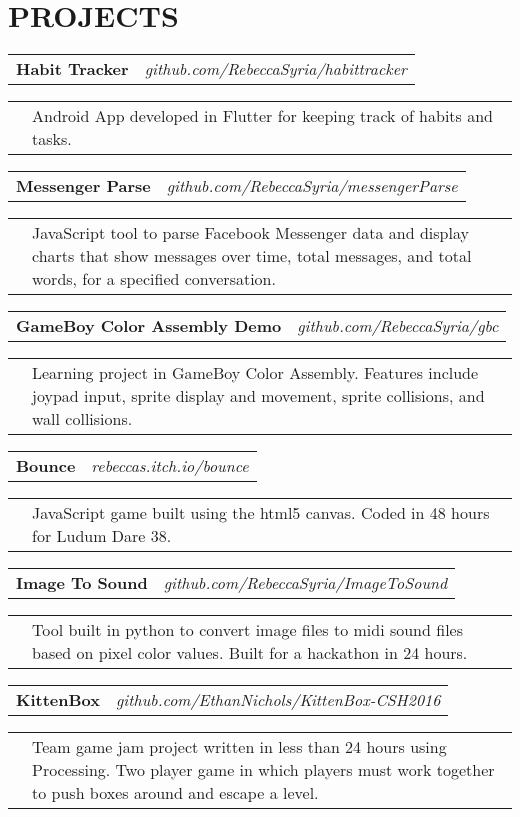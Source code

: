 \documentclass[11pt]{article}
\begin{document}
\section*{PROJECTS}
\begin{tabularx}{\textwidth}{X r}
	\quad\textbf{Habit Tracker} & \textit{github.com/RebeccaSyria/habittracker} \\
\end{tabularx}
\begin{tabularx}{\textwidth}{l X}
	\quad\quad & Android App developed in Flutter for keeping track of habits and tasks. 
\end{tabularx}
\begin{tabularx}{\textwidth}{X r}
	\quad\textbf{Messenger Parse} & \textit{github.com/RebeccaSyria/messengerParse} \\
\end{tabularx}
\begin{tabularx}{\textwidth}{l X}
	\quad\quad & JavaScript tool to parse Facebook Messenger data and display charts that show messages over time, total messages, and total words, for a specified conversation.
\end{tabularx}
\begin{tabularx}{\textwidth}{X r}
	\quad\textbf{GameBoy Color Assembly Demo} & \textit{github.com/RebeccaSyria/gbc} \\
\end{tabularx}
\begin{tabularx}{\textwidth}{l X}
	\quad\quad & Learning project in GameBoy Color Assembly. Features include joypad input, sprite display and movement, sprite collisions, and wall collisions.
\end{tabularx}
\begin{tabularx}{\textwidth}{X r}
	\quad\textbf{Bounce} & \textit{rebeccas.itch.io/bounce} \\
\end{tabularx}
\begin{tabularx}{\textwidth}{l X}
	\quad\quad & JavaScript game built using the html5 canvas. Coded in 48 hours for Ludum Dare 38.
\end{tabularx}
\begin{tabularx}{\textwidth}{X r}
	\quad\textbf{Image To Sound} & \textit{github.com/RebeccaSyria/ImageToSound}
\end{tabularx}
\begin{tabularx}{\textwidth}{l X}
	\quad\quad & Tool built in python to convert image files to midi sound files based on pixel color values. Built for a hackathon in 24 hours.
\end{tabularx}
\begin{tabularx}{\textwidth}{X r}
	\quad\textbf{KittenBox} & \textit{github.com/EthanNichols/KittenBox-CSH2016}
\end{tabularx}
\begin{tabularx}{\textwidth}{l X}
	\quad\quad & Team game jam project written in less than 24 hours using Processing. Two player game in which players must work together to push boxes around and escape a level.
\end{tabularx}
\end{document}
